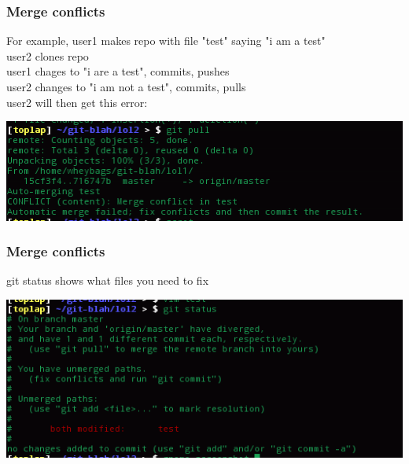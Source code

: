 \documentclass[xcolor=dvipsnames]{beamer}
\begin{document}
\begin{frame}
    \frametitle{Merge conflicts}

    For example, user1 makes repo with file "test" saying "i am a test"\\
    user2 clones repo\\
    user1 chages to "i are a test", commits, pushes\\
    user2 changes to "i am not a test", commits, pulls\\

    user2 will then get this error:
    \begin{center}
        \includegraphics[scale=0.4]{mergeconflict1.png}
    \end{center}
\end{frame}

\begin{frame}
    \frametitle{Merge conflicts}

    git status shows what files you need to fix

    \begin{center}
        \includegraphics[scale=0.4]{mergeconflict2.png}
    \end{center}
\end{frame}
 
\end{document}
